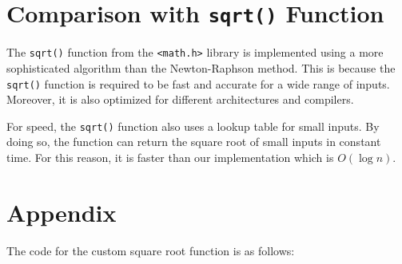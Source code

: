 \documentclass[12pt,letterpaper]{article}
\begin{document}
\section{Comparison with \lstinline|sqrt()| Function}

The \lstinline|sqrt()| function from the \lstinline|<math.h>| library is implemented using a more sophisticated algorithm than the Newton-Raphson method.
This is because the \lstinline|sqrt()| function is required to be fast and accurate for a wide range of inputs.
Moreover, it is also optimized for different architectures and compilers.

For speed, the \lstinline|sqrt()| function also uses a lookup table for small inputs.
By doing so, the function can return the square root of small inputs in constant time.
For this reason, it is faster than our implementation which is $O(\log n)$.


\section{Appendix}

The code for the custom square root function is as follows:
\end{document}
